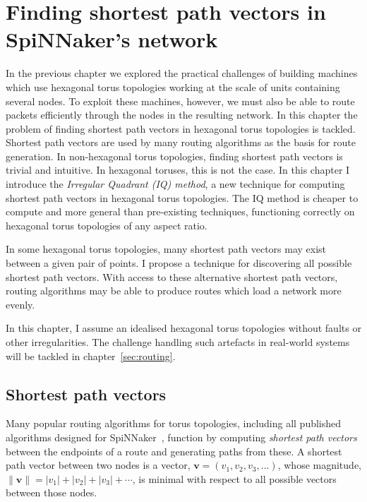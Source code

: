 \chapter{Finding shortest path vectors in SpiNNaker's network}
	
	\label{sec:shortestPaths}
	
	
	In the previous chapter we explored the practical challenges of building
	machines which use hexagonal torus topologies working at the scale of units
	containing several nodes. To exploit these machines, however, we must also be
	able to route packets efficiently through the nodes in the resulting network.
	In this chapter the problem of finding shortest path vectors in hexagonal
	torus topologies is tackled. Shortest path vectors are used by many routing
	algorithms as the basis for route generation. In non-hexagonal torus
	topologies, finding shortest path vectors is trivial and intuitive. In
	hexagonal toruses, this is not the case.  In this chapter I introduce the
	\emph{Irregular Quadrant (IQ) method}, a new technique for computing shortest
	path vectors in hexagonal torus topologies.  The IQ method is cheaper to
	compute and more general than pre-existing techniques, functioning correctly
	on hexagonal torus topologies of any aspect ratio.
	
	In some hexagonal torus topologies, many shortest path vectors may exist
	between a given pair of points. I propose a technique for discovering all
	possible shortest path vectors. With access to these alternative shortest
	path vectors, routing algorithms may be able to produce routes which load a
	network more evenly.
	
	In this chapter, I assume an idealised hexagonal torus topologies without
	faults or other irregularities. The challenge handling such artefacts in
	real-world systems will be tackled in chapter~\ref{sec:routing}.
	
	\section{Shortest path vectors}
		
		Many popular routing algorithms for torus topologies, including all
		published algorithms designed for SpiNNaker~\cite{davies12,navaridas14},
		function by computing \emph{shortest path vectors} between the endpoints of
		a route and generating paths from these. A shortest path vector between two
		nodes is a vector, $\mathbf{v} = (v_1, v_2, v_3, \ldots)$, whose magnitude,
		$\| \mathbf{v} \| = \lvert v_1 \rvert + \lvert v_2 \rvert + \lvert v_3
		\rvert + \cdots$, is minimal with respect to all possible vectors between
		those nodes.
		
